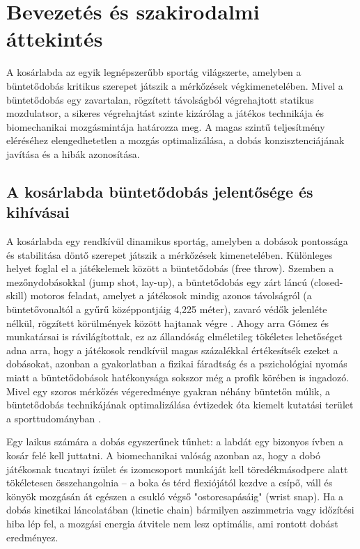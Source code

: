 \chapter{Bevezetés és szakirodalmi áttekintés}
\label{ch:bevezetes_es_szakirodalom}

A kosárlabda az egyik legnépszerűbb sportág világszerte, amelyben a büntetődobás kritikus szerepet játszik a mérkőzések végkimenetelében. Mivel a büntetődobás egy zavartalan, rögzített távolságból végrehajtott statikus mozdulatsor, a sikeres végrehajtást szinte kizárólag a játékos technikája és biomechanikai mozgásmintája határozza meg. A magas szintű teljesítmény eléréséhez elengedhetetlen a mozgás optimalizálása, a dobás konzisztenciájának javítása és a hibák azonosítása.

\section{A kosárlabda büntetődobás jelentősége és kihívásai}
A kosárlabda egy rendkívül dinamikus sportág, amelyben a dobások pontossága és stabilitása döntő szerepet játszik a mérkőzések kimenetelében. Különleges helyet foglal el a játékelemek között a büntetődobás (free throw). Szemben a mezőnydobásokkal (jump shot, lay-up), a büntetődobás egy zárt láncú (closed-skill) motoros feladat, amelyet a játékosok mindig azonos távolságról (a büntetővonaltól a gyűrű középpontjáig 4,225 méter), zavaró védők jelenléte nélkül, rögzített körülmények között hajtanak végre \cite{Gomez2015}. Ahogy arra Gómez és munkatársai \cite{Gomez2015} is rávilágítottak, ez az állandóság elméletileg tökéletes lehetőséget adna arra, hogy a játékosok rendkívül magas százalékkal értékesítsék ezeket a dobásokat, azonban a gyakorlatban a fizikai fáradtság és a pszichológiai nyomás miatt a büntetődobások hatékonysága sokszor még a profik körében is ingadozó. Mivel egy szoros mérkőzés végeredménye gyakran néhány büntetőn múlik, a büntetődobás technikájának optimalizálása évtizedek óta kiemelt kutatási terület a sporttudományban \cite{Hudson1985}.

Egy laikus számára a dobás egyszerűnek tűnhet: a labdát egy bizonyos ívben a kosár felé kell juttatni. A biomechanikai valóság azonban az, hogy a dobó játékosnak tucatnyi ízület és izomcsoport munkáját kell töredékmásodperc alatt tökéletesen összehangolnia – a boka és térd flexiójától kezdve a csípő, váll és könyök mozgásán át egészen a csukló végső "ostorcsapásáig" (wrist snap). Ha a dobás kinetikai láncolatában (kinetic chain) bármilyen aszimmetria vagy időzítési hiba lép fel, a mozgási energia átvitele nem lesz optimális, ami rontott dobást eredményez.

